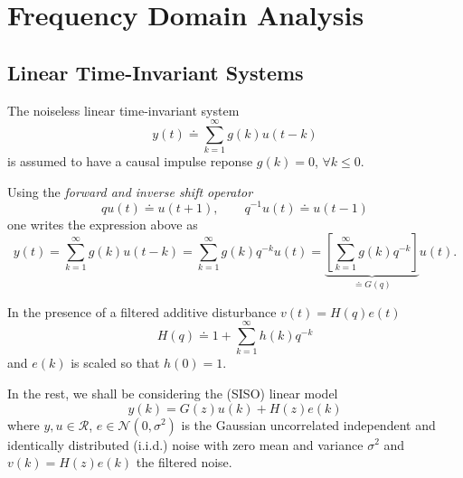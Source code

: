 \chapter{Frequency Domain Analysis}
\label{chap:frequency-domain}

\section{Linear Time-Invariant Systems}
\label{sec:LTI}

The noiseless linear time-invariant system
\begin{equation*}
  y(t) \doteq \sum_{k=1}^\infty g(k)u(t-k)
\end{equation*}
is assumed to have a causal impulse reponse $g(k)=0$, $\forall k\le 0$.

Using the \emph{forward and inverse shift operator}~\cite[p.~24]{ljung}
\begin{equation*}
  qu(t) \doteq u(t+1), \hspace{2em} q^{-1}u(t) \doteq u(t-1)
\end{equation*}
one writes the expression above as
\begin{equation*}
  y(t) = \sum_{k=1}^\infty g(k)u(t-k) = \sum_{k=1}^\infty g(k)q^{-k}u(t) = \underbrace{\left[\sum_{k=1}^\infty g(k)q^{-k}\right]}_{\doteq G(q)}u(t).
\end{equation*}

In the presence of a filtered additive disturbance $v(t)=H(q)e(t)$
\begin{equation*}
  H(q) \doteq 1 + \sum_{k=1}^\infty h(k)q^{-k}
\end{equation*}
and $e(k)$ is scaled so that $h(0)=1$.

In the rest, we shall be considering the (SISO) linear model
\begin{equation}
  \label{eq:linear-model-noise}
  y(k) = G(z)u(k) + H(z)e(k)
\end{equation}
where $y,u \in \mathcal{R}$, $e \in \mathcal{N}(0,\sigma^2)$ is the Gaussian uncorrelated independent and identically distributed (i.i.d.) noise with zero mean and variance $\sigma^2$ and $v(k) = H(z)e(k)$ the filtered noise.

